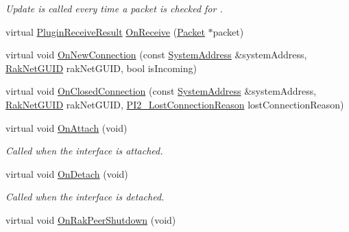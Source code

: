 \begin{DoxyCompactItemize}
\begin{DoxyCompactList}\small\item\em Update is called every time a packet is checked for . \end{DoxyCompactList}\item 
virtual \hyperlink{group___p_l_u_g_i_n___i_n_t_e_r_f_a_c_e___g_r_o_u_p_ga89998adaafb29e5d879113b992161085}{Plugin\-Receive\-Result} \hyperlink{class_rak_net_1_1_nat_punchthrough_client_a417a0812408c178e1e95d8983389e286}{On\-Receive} (\hyperlink{struct_rak_net_1_1_packet}{Packet} $\ast$packet)
\item 
virtual void \hyperlink{class_rak_net_1_1_nat_punchthrough_client_a9819ed681b72317c2c97fc1f2abfc947}{On\-New\-Connection} (const \hyperlink{struct_rak_net_1_1_system_address}{System\-Address} \&system\-Address, \hyperlink{struct_rak_net_1_1_rak_net_g_u_i_d}{Rak\-Net\-G\-U\-I\-D} rak\-Net\-G\-U\-I\-D, bool is\-Incoming)
\item 
virtual void \hyperlink{class_rak_net_1_1_nat_punchthrough_client_a67db8e781fea747763df43240a29a84f}{On\-Closed\-Connection} (const \hyperlink{struct_rak_net_1_1_system_address}{System\-Address} \&system\-Address, \hyperlink{struct_rak_net_1_1_rak_net_g_u_i_d}{Rak\-Net\-G\-U\-I\-D} rak\-Net\-G\-U\-I\-D, \hyperlink{group___p_l_u_g_i_n___i_n_t_e_r_f_a_c_e___g_r_o_u_p_ga376cc546fd6892c2ead48cd51796c8b8}{P\-I2\-\_\-\-Lost\-Connection\-Reason} lost\-Connection\-Reason)
\item 
\hypertarget{class_rak_net_1_1_nat_punchthrough_client_abec4863d26aa274f92e710245669d13b}{virtual void \hyperlink{class_rak_net_1_1_nat_punchthrough_client_abec4863d26aa274f92e710245669d13b}{On\-Attach} (void)}\label{class_rak_net_1_1_nat_punchthrough_client_abec4863d26aa274f92e710245669d13b}

\begin{DoxyCompactList}\small\item\em Called when the interface is attached. \end{DoxyCompactList}\item 
\hypertarget{class_rak_net_1_1_nat_punchthrough_client_a5f57399d9383c6bb3ff9a3ce64326572}{virtual void \hyperlink{class_rak_net_1_1_nat_punchthrough_client_a5f57399d9383c6bb3ff9a3ce64326572}{On\-Detach} (void)}\label{class_rak_net_1_1_nat_punchthrough_client_a5f57399d9383c6bb3ff9a3ce64326572}

\begin{DoxyCompactList}\small\item\em Called when the interface is detached. \end{DoxyCompactList}\item 
\hypertarget{class_rak_net_1_1_nat_punchthrough_client_a1563e46fb5626c93da63a39e549f9147}{virtual void \hyperlink{class_rak_net_1_1_nat_punchthrough_client_a1563e46fb5626c93da63a39e549f9147}{On\-Rak\-Peer\-Shutdown} (void)}\label{class_rak_net_1_1_nat_punchthrough_client_a1563e46fb5626c93da63a39e549f9147}


\end{DoxyCompactItemize}
